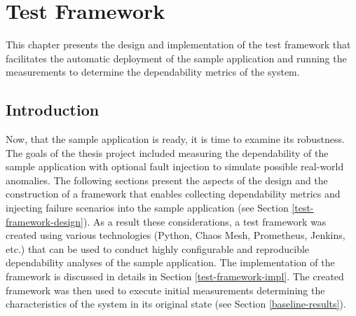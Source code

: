 \chapter{Test Framework} \label{test-framework}

This chapter presents the design and implementation of the test framework that facilitates the automatic deployment of the sample application and running the measurements to determine the dependability metrics of the system.

\section{Introduction}

Now, that the sample application is ready, it is time to examine its robustness. The goals of the thesis project included measuring the dependability of the sample application with optional fault injection to simulate possible real-world anomalies. The following sections present the aspects of the design and the construction of a framework that enables collecting dependability metrics and injecting failure scenarios into the sample application (see Section \ref{test-framework-design}). As a result these considerations, a test framework was created using various technologies (Python, Chaos Mesh, Prometheus, Jenkins, etc.) that can be used to conduct highly configurable and reproducible dependability analyses of the sample application. The implementation of the framework is discussed in details in Section \ref{test-framework-impl}. The created framework was then used to execute initial measurements determining the characteristics of the system in its original state (see Section \ref{baseline-results}).


